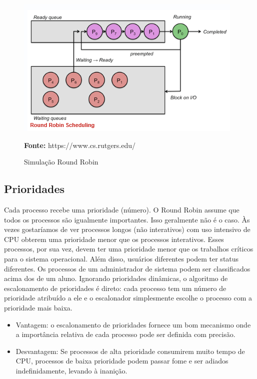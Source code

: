 \documentclass[times, 10pt,twocolumn]{article}
\begin{document}
\begin{figure}[!htb]
	\centering
	\includegraphics[width=.5\textwidth]{figuras/ilusrr}
	\caption{Simulação Round Robin} 
	\textbf{Fonte:} https://www.cs.rutgers.edu/ \cite{rutgers}
	\label{fig:figura-ilus2}
\end{figure}    

\subsection{Prioridades}  
 Cada processo recebe uma prioridade (número). O Round Robin assume que todos os processos são igualmente importantes. Isso geralmente não é o caso. Às vezes gostaríamos de ver processos longos (não interativos) com uso intensivo de CPU obterem uma prioridade menor que os processos interativos. Esses processos, por sua vez, devem ter uma prioridade menor que os trabalhos críticos para o sistema operacional.
Além disso, usuários diferentes podem ter status diferentes. Os processos de um administrador de sistema podem ser classificados acima dos de um aluno. 
Ignorando prioridades dinâmicas, o algoritmo de escalonamento de prioridades é direto: cada processo tem um número de prioridade atribuído a ele e o escalonador simplesmente escolhe o processo com a prioridade mais baixa. \cite{rutgers} 
\begin{itemize}
\item Vantagem: o escalonamento de prioridades fornece um bom mecanismo onde a importância relativa de cada processo pode ser definida com precisão.
\item Desvantagem: Se processos de alta prioridade consumirem muito tempo de CPU, processos de baixa prioridade podem passar fome e ser adiados indefinidamente, levando à inanição. 
\end{itemize} 
\end{document}
